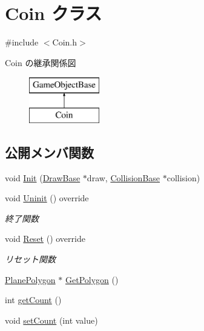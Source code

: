 \hypertarget{class_coin}{}\section{Coin クラス}
\label{class_coin}


{\ttfamily \#include $<$Coin.\+h$>$}

Coin の継承関係図\begin{figure}[H]
\begin{center}
\leavevmode
\includegraphics[height=2.000000cm]{class_coin}
\end{center}
\end{figure}
\subsection*{公開メンバ関数}
\begin{DoxyCompactItemize}
\item 
void \mbox{\hyperlink{class_coin_aecb007762f15ecc91cd6a699e60c2e19}{Init}} (\mbox{\hyperlink{class_draw_base}{Draw\+Base}} $\ast$draw, \mbox{\hyperlink{class_collision_base}{Collision\+Base}} $\ast$collision)
\item 
void \mbox{\hyperlink{class_coin_a4d364dcb4b57b80ea00ce931d0bb300f}{Uninit}} () override
\begin{DoxyCompactList}\small\item\em 終了関数 \end{DoxyCompactList}\item 
void \mbox{\hyperlink{class_coin_a52c50229ce7c1e0f459e198adac70c8d}{Reset}} () override
\begin{DoxyCompactList}\small\item\em リセット関数 \end{DoxyCompactList}\item 
\mbox{\hyperlink{class_plane_polygon}{Plane\+Polygon}} $\ast$ \mbox{\hyperlink{class_coin_af435ca01cc92d7214e7bc94ed486ab7b}{Get\+Polygon}} ()
\item 
int \mbox{\hyperlink{class_coin_a5b302d3ad7be44267e1f4e6a54b0f23c}{get\+Count}} ()
\item 
void \mbox{\hyperlink{class_coin_acb3027a1a45470723b7952c73af69878}{set\+Count}} (int value)
\end{DoxyCompactItemize}
